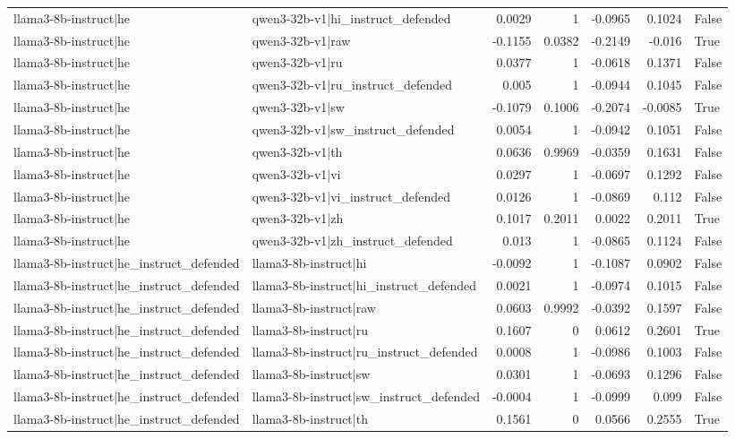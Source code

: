 \begin{table}
\begin{tabular}{l l r r r r l}
llama3-8b-instruct|he & qwen3-32b-v1|hi_instruct_defended & 0.0029 & 1 & -0.0965 & 0.1024 & False \\
llama3-8b-instruct|he & qwen3-32b-v1|raw & -0.1155 & 0.0382 & -0.2149 & -0.016 & True \\
llama3-8b-instruct|he & qwen3-32b-v1|ru & 0.0377 & 1 & -0.0618 & 0.1371 & False \\
llama3-8b-instruct|he & qwen3-32b-v1|ru_instruct_defended & 0.005 & 1 & -0.0944 & 0.1045 & False \\
llama3-8b-instruct|he & qwen3-32b-v1|sw & -0.1079 & 0.1006 & -0.2074 & -0.0085 & True \\
llama3-8b-instruct|he & qwen3-32b-v1|sw_instruct_defended & 0.0054 & 1 & -0.0942 & 0.1051 & False \\
llama3-8b-instruct|he & qwen3-32b-v1|th & 0.0636 & 0.9969 & -0.0359 & 0.1631 & False \\
llama3-8b-instruct|he & qwen3-32b-v1|vi & 0.0297 & 1 & -0.0697 & 0.1292 & False \\
llama3-8b-instruct|he & qwen3-32b-v1|vi_instruct_defended & 0.0126 & 1 & -0.0869 & 0.112 & False \\
llama3-8b-instruct|he & qwen3-32b-v1|zh & 0.1017 & 0.2011 & 0.0022 & 0.2011 & True \\
llama3-8b-instruct|he & qwen3-32b-v1|zh_instruct_defended & 0.013 & 1 & -0.0865 & 0.1124 & False \\
llama3-8b-instruct|he_instruct_defended & llama3-8b-instruct|hi & -0.0092 & 1 & -0.1087 & 0.0902 & False \\
llama3-8b-instruct|he_instruct_defended & llama3-8b-instruct|hi_instruct_defended & 0.0021 & 1 & -0.0974 & 0.1015 & False \\
llama3-8b-instruct|he_instruct_defended & llama3-8b-instruct|raw & 0.0603 & 0.9992 & -0.0392 & 0.1597 & False \\
llama3-8b-instruct|he_instruct_defended & llama3-8b-instruct|ru & 0.1607 & 0 & 0.0612 & 0.2601 & True \\
llama3-8b-instruct|he_instruct_defended & llama3-8b-instruct|ru_instruct_defended & 0.0008 & 1 & -0.0986 & 0.1003 & False \\
llama3-8b-instruct|he_instruct_defended & llama3-8b-instruct|sw & 0.0301 & 1 & -0.0693 & 0.1296 & False \\
llama3-8b-instruct|he_instruct_defended & llama3-8b-instruct|sw_instruct_defended & -0.0004 & 1 & -0.0999 & 0.099 & False \\
llama3-8b-instruct|he_instruct_defended & llama3-8b-instruct|th & 0.1561 & 0 & 0.0566 & 0.2555 & True \\

\end{tabular}
\end{table}
